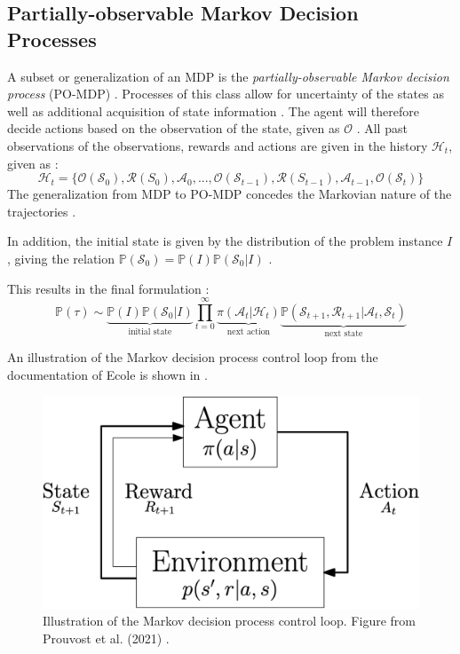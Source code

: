 \subsection{Partially-observable Markov Decision Processes}

A subset or generalization of an \gls{MDP} is the \textit{partially-observable Markov decision process }(\gls{PO-MDP}) \cite{monahan1982state}. Processes of this class allow for uncertainty of the states as well as additional acquisition of state information \cite{monahan1982state}. The agent will therefore decide actions based on the observation of the state, given as $\mathcal{O}$ \cite{prouvost2021ecole}. All past observations of the observations, rewards and actions are given in the history $\mathcal{H}_t$, given as \cite{prouvost2021ecole}:
\begin{equation}
    \mathcal{H}_t = \{\mathcal{O}(\mathcal{S}_0), \mathcal{R}(S_0), \mathcal{A}_0, ..., \mathcal{O}(\mathcal{S}_{t-1}), \mathcal{R}(S_{t-1}), \mathcal{A}_{t-1}, \mathcal{O}(\mathcal{S}_t)\}
\end{equation}
The generalization from \gls{MDP} to \gls{PO-MDP} concedes the Markovian nature of the trajectories \cite{prouvost2020ecole}.

In addition, the initial state is given by the distribution of the problem instance $I$, giving the relation $\mathbb{P}(\mathcal{S}_0) = \mathbb{P}(I) \mathbb{P}(\mathcal{S}_0 | I)  $ \cite{prouvost2021ecole}. 

This results in the final formulation \cite{prouvost2021ecole}:
\begin{equation}
    \mathbb{P}(\tau) \sim \underbrace{ \mathbb{P}(I) \mathbb{P}(\mathcal{S}_0 | I)  }_{\text{initial state}}
\prod_{t=0}^\infty \underbrace{\pi(\mathcal{A}_t | \mathcal{H}_t)}_{\text{next action}}
\underbrace{\mathbb{P}(\mathcal{S}_{t+1}, \mathcal{R}_{t+1} | \mathcal{A}_t, \mathcal{S}_t)}_{\text{next state}}
\end{equation}

An illustration of the Markov decision process control loop from the documentation of \gls{Ecole} is shown in .

\begin{figure}
    \centering
    \includegraphics[width=0.55\linewidth]{img/mdp.png}
    \caption{Illustration of the Markov decision process control loop. Figure from Prouvost et al. (2021) \cite{prouvost2021ecole}.}
    \label{fig:mdp}
\end{figure}



